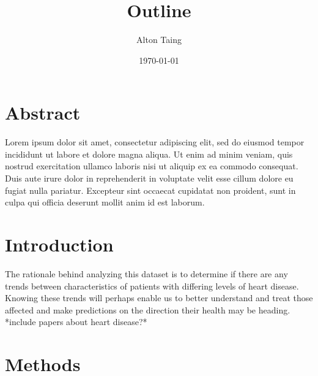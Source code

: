 \documentclass[letterpaper]{article}
\title{Outline}
\author{Alton Taing}
\date{\today}
\begin{document}
\maketitle
\section*{Abstract}
Lorem ipsum dolor sit amet, consectetur adipiscing elit, sed do eiusmod tempor incididunt ut labore et dolore magna aliqua. Ut enim ad minim veniam, quis nostrud exercitation ullamco laboris nisi ut aliquip ex ea commodo consequat. Duis aute irure dolor in reprehenderit in voluptate velit esse cillum dolore eu fugiat nulla pariatur. Excepteur sint occaecat cupidatat non proident, sunt in culpa qui officia deserunt mollit anim id est laborum.

\newpage
\tableofcontents
\listoffigures
\newpage

\section{Introduction}
The rationale behind analyzing this dataset is to determine if there are any trends between characteristics of patients with differing levels of heart disease. Knowing these trends will perhaps enable us to better understand and treat those affected and make predictions on the direction their health may be heading. 
*include papers about heart disease?*

\section{Methods}
\end{document}
